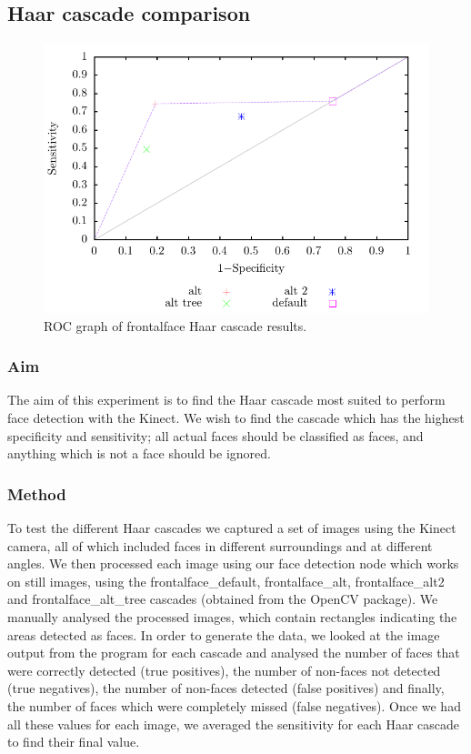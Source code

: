 \documentclass[conference]{IEEEtran}
\begin{document}
\subsection{Haar cascade comparison}
\begin{figure}
  \includegraphics[width=\columnwidth]{haar_ROC}
  \caption{ROC graph of frontalface Haar cascade results.}
  \label{fig:haar}
\end{figure}
\subsubsection{Aim}
The aim of this experiment is to find the Haar cascade most suited to perform face detection with the Kinect. We wish to find the cascade which has the highest specificity and sensitivity; all actual faces should be classified as faces, and anything which is not a face should be ignored.
\subsubsection{Method}
To test the different Haar cascades we captured a set of images using the Kinect camera, all of which included faces in different surroundings and at different angles. We then processed each image using our face detection node which works on still images, using the frontalface\_default, frontalface\_alt, frontalface\_alt2 and frontalface\_alt\_tree cascades (obtained from the OpenCV package). We manually analysed the processed images, which contain rectangles indicating the areas detected as faces. In order to generate the data, we looked at the image output from the program for each cascade and analysed the number of faces that were correctly detected (true positives), the number of non-faces not detected (true negatives), the number of non-faces detected (false positives) and finally, the number of faces which were completely missed (false negatives). Once we had all these values for each image, we averaged the sensitivity for each Haar cascade to find their final value.
\end{document}
